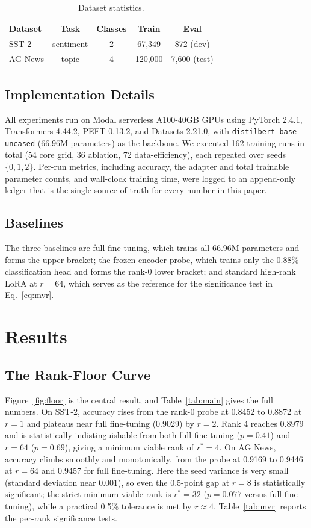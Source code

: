 \documentclass[conference]{IEEEtran}
\begin{document}
\begin{table}[t]
\caption{Dataset statistics.}
\label{tab:datasets}
\centering
\begin{tabular}{lcccc}
\toprule
Dataset & Task & Classes & Train & Eval \\
\midrule
SST-2 & sentiment & 2 & 67{,}349 & 872 (dev) \\
AG News & topic & 4 & 120{,}000 & 7{,}600 (test) \\
\bottomrule
\end{tabular}
\end{table}

\subsection{Implementation Details}
All experiments run on Modal serverless A100-40GB GPUs using PyTorch 2.4.1, Transformers 4.44.2, PEFT 0.13.2, and Datasets 2.21.0, with \texttt{distilbert-base-uncased} (66.96M parameters) as the backbone. We executed 162 training runs in total (54 core grid, 36 ablation, 72 data-efficiency), each repeated over seeds $\{0,1,2\}$. Per-run metrics, including accuracy, the adapter and total trainable parameter counts, and wall-clock training time, were logged to an append-only ledger that is the single source of truth for every number in this paper.

\subsection{Baselines}
The three baselines are full fine-tuning, which trains all 66.96M parameters and forms the upper bracket; the frozen-encoder probe, which trains only the 0.88\% classification head and forms the rank-0 lower bracket; and standard high-rank LoRA at $r{=}64$, which serves as the reference for the significance test in Eq.~\eqref{eq:mvr}.

\section{Results}
\label{sec:results}

\subsection{The Rank-Floor Curve}
Figure~\ref{fig:floor} is the central result, and Table~\ref{tab:main} gives the full numbers. On SST-2, accuracy rises from the rank-0 probe at 0.8452 to 0.8872 at $r{=}1$ and plateaus near full fine-tuning (0.9029) by $r{=}2$. Rank 4 reaches 0.8979 and is statistically indistinguishable from both full fine-tuning ($p{=}0.41$) and $r{=}64$ ($p{=}0.69$), giving a minimum viable rank of $r^\ast{=}4$. On AG News, accuracy climbs smoothly and monotonically, from the probe at 0.9169 to 0.9446 at $r{=}64$ and 0.9457 for full fine-tuning. Here the seed variance is very small (standard deviation near 0.001), so even the 0.5-point gap at $r{=}8$ is statistically significant; the strict minimum viable rank is $r^\ast{=}32$ ($p{=}0.077$ versus full fine-tuning), while a practical 0.5\% tolerance is met by $r{\approx}4$. Table~\ref{tab:mvr} reports the per-rank significance tests.
\end{document}
